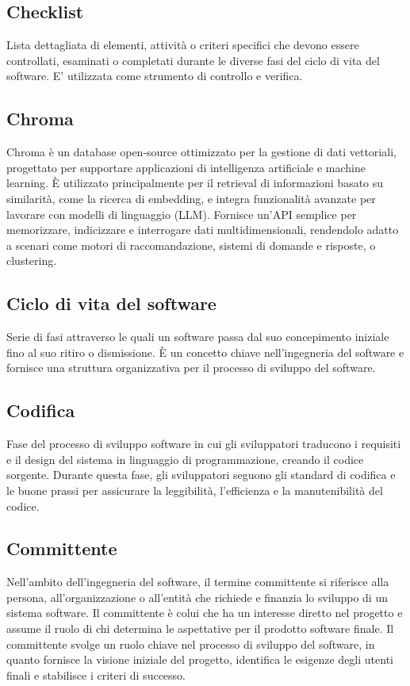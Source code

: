 \subsection*{Checklist}
Lista dettagliata di elementi, attività o criteri specifici che devono essere controllati, esaminati o completati durante le diverse fasi del ciclo di vita 
del software. E' utilizzata come strumento di controllo e verifica.

\hypertarget{sec:chroma}{}
\subsection*{Chroma}
Chroma è un database open-source ottimizzato per la gestione di dati vettoriali, progettato per supportare applicazioni di intelligenza artificiale e 
machine learning. È utilizzato principalmente per il retrieval di informazioni basato su similarità, come la ricerca di embedding, e integra funzionalità 
avanzate per lavorare con modelli di linguaggio (LLM). Fornisce un'API semplice per memorizzare, indicizzare e interrogare dati multidimensionali, 
rendendolo adatto a scenari come motori di raccomandazione, sistemi di domande e risposte, o clustering.

\hypertarget{sec:ciclo_di_vita}{}
\subsection*{Ciclo di vita del software}
Serie di fasi attraverso le quali un software passa dal suo concepimento iniziale fino al suo ritiro o dismissione. È un concetto chiave nell'ingegneria 
del software e fornisce una struttura organizzativa per il processo di sviluppo del software.

\hypertarget{sec:codifica}{}
\subsection*{Codifica}
Fase del processo di sviluppo software in cui gli sviluppatori traducono i requisiti e il design del sistema in linguaggio di programmazione, creando il 
codice sorgente. Durante questa fase, gli sviluppatori seguono gli standard di codifica e le buone prassi per assicurare la leggibilità, l’efficienza e la 
manutenibilità del codice.

\hypertarget{sec:committente}{}
\subsection*{Committente}
Nell’ambito dell’ingegneria del software, il termine committente si riferisce alla persona, all’organizzazione o all’entità che richiede e 
finanzia lo sviluppo di un sistema software. Il committente è colui che ha un interesse diretto nel progetto e assume il ruolo
di chi determina le aspettative per il prodotto software finale. Il committente svolge un ruolo chiave nel processo di sviluppo del software, 
in quanto fornisce la visione iniziale del progetto, identifica le esigenze degli utenti finali e stabilisce i criteri di successo.

